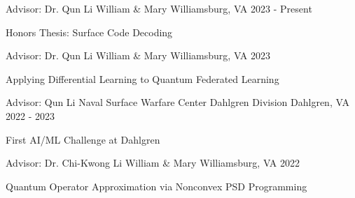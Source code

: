 
\begin{cventries}
\cventry
{Advisor: Dr. Qun Li}
{William \& Mary}
{Williamsburg, VA}
{2023 - Present}
{
\begin{cvitems}
\item{Honors Thesis: Surface Code Decoding}
\end{cvitems}
}

\cventry
{Advisor: Dr. Qun Li}
{William \& Mary}
{Williamsburg, VA}
{2023}
{
\begin{cvitems}
\item{Applying Differential Learning to Quantum Federated Learning}
\end{cvitems}
}

\cventry
{Advisor: Qun Li}
{Naval Surface Warfare Center Dahlgren Division}
{Dahlgren, VA}
{2022 - 2023}
{
\begin{cvitems}
\item{First AI/ML Challenge at Dahlgren}
\end{cvitems}
}

\cventry
{Advisor: Dr. Chi-Kwong Li}
{William \& Mary}
{Williamsburg, VA}
{2022}
{
\begin{cvitems}
\item{Quantum Operator Approximation via Nonconvex PSD Programming}
\end{cvitems}
}


\end{cventries}
